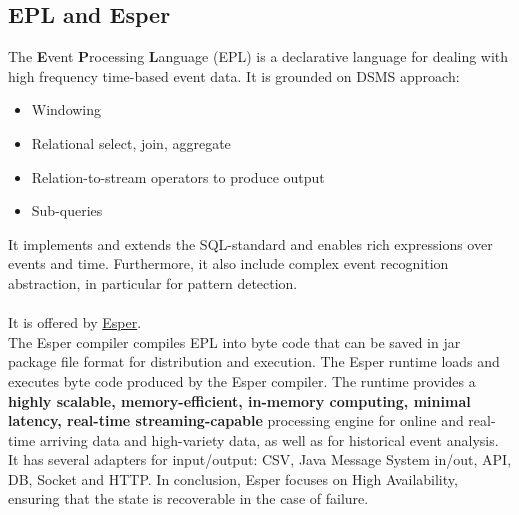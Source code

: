 \documentclass[10pt,a4paper]{article}
\newcommand{\nline}{\\~\\}
\begin{document}
\subsection{EPL and Esper}
The \textbf{E}vent \textbf{P}rocessing \textbf{L}anguage (EPL) is a declarative language for dealing with high frequency time-based event data. It is grounded on DSMS approach:
\begin{itemize}
	\item Windowing
	\item Relational select, join, aggregate
	\item Relation-to-stream operators to produce output
	\item Sub-queries
\end{itemize}
It implements and extends the SQL-standard and enables rich expressions over events and time. Furthermore, it also include complex event recognition abstraction, in particular for pattern detection.
\nline
It is offered by \href{https://www.espertech.com/esper/}{Esper}. \\
The Esper compiler compiles EPL into byte code that can be saved in jar package file format for distribution and execution. The Esper runtime loads and executes byte code produced by the Esper compiler. The runtime provides a \textbf{highly scalable, memory-efficient, in-memory computing, minimal latency, real-time streaming-capable} processing engine for online and real-time arriving data and high-variety data, as well as for historical event analysis. 	\\
It has several adapters for input/output: CSV, Java Message System in/out, API, DB, Socket and HTTP. In conclusion, Esper focuses on High Availability, ensuring that the state is recoverable in the case of failure.
\end{document}
